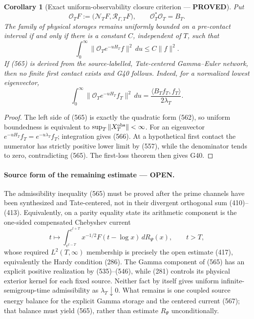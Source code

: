\documentclass[11pt]{article}
\newtheorem{corollary}[theorem]{Corollary}
\newcommand{\PROVED}{\textcolor{green!45!black}{\textbf{PROVED}}}
\newcommand{\OPEN}{\textcolor{red!70!black}{\textbf{OPEN}}}
\begin{document}
\begin{corollary}[Exact uniform-observability closure criterion ---
\PROVED]
Put
\[
 \mathcal O_TF:=
 \bigl(\mathcal N_TF,\mathcal R_{\Gamma,T}F\bigr),
 \qquad \mathcal O_T^*\mathcal O_T=B_T .
\]
The family of physical storages remains uniformly bounded on a pre-contact
interval if and only if there is a constant \(C\), independent of \(T\), such
that
\begin{equation}
 \boxed{\int_0^\infty
 \|\mathcal O_Te^{-uH_T}f\|^2\,du
 \le C\|f\|^2.}                                      \tag{565}
\end{equation}
If (565) is derived from the source-labelled, Tate-centered
Gamma--Euler network, then no finite first contact exists and G40 follows.
Indeed, for a normalized lowest eigenvector,
\begin{equation}
 \int_0^\infty
 \|\mathcal O_Te^{-uH_T}f_T\|^2\,du
 =\frac{\langle B_Tf_T,f_T\rangle}{2\lambda_T}.       \tag{566}
\end{equation}
\end{corollary}

\begin{proof}
The left side of (565) is exactly the quadratic form (562), so uniform
boundedness is equivalent to \(\sup_T\|X_T^{\rm obs}\|<\infty\).
For an eigenvector \(e^{-uH_T}f_T=e^{-u\lambda_T}f_T\); integration gives
(566).  At a hypothetical first contact the numerator has strictly positive
lower limit by (557), while the denominator tends to zero, contradicting
(565).  The first-loss theorem then gives G40.
\end{proof}

\paragraph{Source form of the remaining estimate --- \OPEN.}
The admissibility inequality (565) must be proved after the prime channels
have been synthesized and Tate-centered, not in their divergent orthogonal
sum (410)--(413).  Equivalently, on a parity equality state its arithmetic
component is the one-sided compensated Chebyshev current
\begin{equation}
 t\longmapsto
 \int_{e^{t-T}}^{e^{t+T}}
 x^{-1/2}F(t-\log x)\,dR_\Psi(x),\qquad t>T,          \tag{567}
\end{equation}
whose required \(L^2(T,\infty)\) membership is precisely the open estimate
(417), equivalently the Hardy condition (286).  The Gamma component of
(565) has an explicit positive realization by (535)--(546), while (281)
controls its physical exterior kernel for each fixed source.  Neither fact
by itself gives uniform infinite-semigroup-time admissibility as
\(\lambda_T\downarrow0\).  What remains is one coupled source energy
balance for the explicit Gamma storage and the centered current (567);
that balance must yield (565), rather than estimate \(R_\Psi\)
unconditionally.
\end{document}
